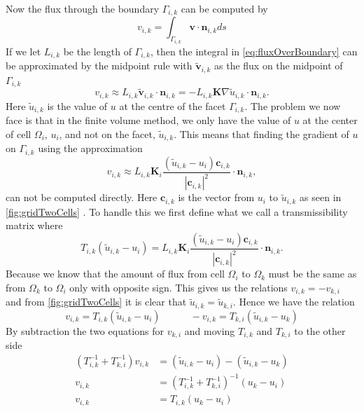  Now the flux through the boundary $\Gamma_{i,k}$ can be computed by
\begin{equation}
    v_{i,k} = \int_{\Gamma_{i,k}} \textbf{v}\cdot\textbf{n}_{i,k} ds 
    \label{eq:fluxOverBoundary}
\end{equation}
If we let $L_{i,k}$ be the length of $\Gamma_{i,k}$, then the integral in \eqref{eq:fluxOverBoundary} can be approximated by the midpoint rule with $\tilde{\textbf{v}}_{i,k}$ as the flux on the midpoint of $\Gamma_{i,k}$ 
\begin{equation*}
    v_{i,k} \approx L_{i,k}\tilde{\textbf{v}}_{i,k} \cdot \textbf{n}_{i,k} = -L_{i,k}\textbf{K}\nabla \tilde{u}_{i,k} \cdot \textbf{n}_{i,k}.
\end{equation*}
Here $\tilde{u}_{i,k}$ is the value of $u$ at the centre of the facet $\Gamma_{i,k}$. The problem we now face is that in the finite volume method, we only have the value of $u$ at the center of cell $\Omega_i$, $u_i$, and not on the facet, $\tilde{u}_{i,k}$. This means that finding the gradient of $u$ on $\Gamma_{i,k}$ using the approximation
\begin{equation*}
    v_{i,k} \approx L_{i,k}\textbf{K}_i\frac{(\tilde{u}_{i,k} - u_i)\textbf{c}_{i,k}}{|\textbf{c}_{i,k}|^2} \cdot \textbf{n}_{i,k},
\end{equation*}
can not be computed directly. Here $\textbf{c}_{i,k}$ is the vector from $u_i$ to $\tilde{u}_{i,k}$ as seen in \autoref{fig:gridTwoCells} . To handle this we first define what we call a transmissibility matrix where
\begin{equation}
    T_{i,k}(\tilde{u}_{i,k} - u_i) = L_{i,k}\textbf{K}_i\frac{(\tilde{u}_{i,k} - u_i)\textbf{c}_{i,k}}{|\textbf{c}_{i,k}|^2} \cdot \textbf{n}_{i,k}.
    \label{eq:transmissibility}
\end{equation}
Because we know that the amount of flux from cell $\Omega_i$ to $\Omega_k$ must be the same as from $\Omega_k$ to $\Omega_i$ only with opposite sign. This gives us the relations $v_{i,k} = -v_{k,i}$ and from \autoref{fig:gridTwoCells} it is clear that $\tilde{u}_{i,k} = \tilde{u}_{k,i}$. Hence we have the relation 
\begin{equation*}
    v_{i,k} = T_{i,k}(\tilde{u}_{i,k} - u_i) \hspace{3em} -v_{i,k} = T_{k,i}(\tilde{u}_{i,k} - u_k)
\end{equation*}
By subtraction the two equations for $v_{k,i}$ and moving $T_{i,k}$ and $T_{k,i}$ to the other side 
\begin{equation}
    \begin{aligned}
        (T_{i,k}^{-1} + T_{k,i}^{-1}) v_{i,k} &= (\tilde{u}_{i,k} - u_i) - (\tilde{u}_{i,k} - u_k)
        \\
        v_{i,k} &= (T_{i,k}^{-1} + T_{k,i}^{-1})^{-1}(u_k - u_i) \\
        v_{i,k} &= T_{i,k}(u_k - u_i)
    \end{aligned}
    \label{eq:flux}
\end{equation}
